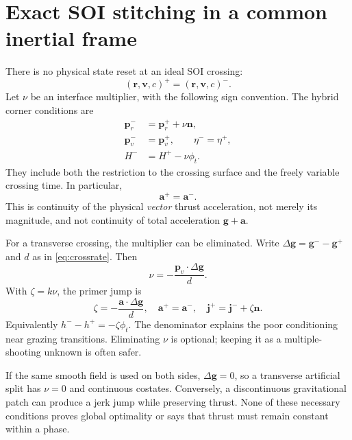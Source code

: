 \documentclass[journal, a4paper]{IEEEtran}
\begin{document}
\section{Exact SOI stitching in a common inertial frame}
There is no physical state reset at an ideal SOI crossing:
\begin{equation}
 (\mathbf r,\mathbf v,c)^+=(\mathbf r,\mathbf v,c)^-.
 \label{eq:statejoin}
\end{equation}
Let $\nu$ be an interface multiplier, with the following sign convention. The hybrid corner conditions are
\begin{align}
 \mathbf p_r^-&=\mathbf p_r^++\nu\mathbf n,\nonumber\\
 \mathbf p_v^-&=\mathbf p_v^+,\qquad \eta^- =\eta^+,\label{eq:costatejoin}\\
 H^-&=H^+-\nu\phi_t.\nonumber
\end{align}
They include both the restriction to the crossing surface and the freely variable crossing time. In particular,
\begin{equation}
 \boxed{\mathbf a^+=\mathbf a^-.}
 \label{eq:acont}
\end{equation}
This is continuity of the physical \emph{vector} thrust acceleration, not merely its magnitude, and not continuity of total acceleration $\mathbf g+\mathbf a$.

For a transverse crossing, the multiplier can be eliminated. Write $\Delta\mathbf g=\mathbf g^- -\mathbf g^+$ and $d$ as in \eqref{eq:crossrate}. Then
\begin{equation}
 \nu=-\frac{\mathbf p_v\cdot\Delta\mathbf g}{d}.
\end{equation}
With $\zeta=k\nu$, the primer jump is
\begin{equation}
 \boxed{\zeta=-\frac{\mathbf a\cdot\Delta\mathbf g}{d},\quad
 \mathbf a^+=\mathbf a^-,\quad
 \mathbf j^+=\mathbf j^-+\zeta\mathbf n.}
 \label{eq:primerjump}
\end{equation}
Equivalently $h^- -h^+=-\zeta\phi_t$. The denominator explains the poor conditioning near grazing transitions. Eliminating $\nu$ is optional; keeping it as a multiple-shooting unknown is often safer.

If the same smooth field is used on both sides, $\Delta\mathbf g=0$, so a transverse artificial split has $\nu=0$ and continuous costates. Conversely, a discontinuous gravitational patch can produce a jerk jump while preserving thrust. None of these necessary conditions proves global optimality or says that thrust must remain constant within a phase.
\end{document}
